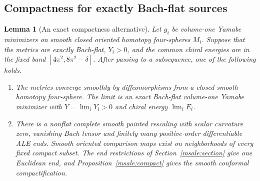 \documentclass[11pt]{article}
\numberwithin{equation}{section}
\newtheorem{lemma}[theorem]{Lemma}
\theoremstyle{definition}
\theoremstyle{remark}
\begin{document}
\subsection{Compactness for exactly Bach-flat sources}

\begin{lemma}[An exact compactness alternative]\label{msgap:compactness}
Let \(g_i\) be volume-one Yamabe minimizers on smooth closed oriented
homotopy four-spheres \(M_i\). Suppose that the metrics are exactly
Bach-flat, \(Y_i>0\), and the common chiral energies are in the
fixed band \([4\pi^2,8\pi^2-\delta]\).
After passing to a subsequence, one of the following holds.
\begin{enumerate}[label=\textup{(\roman*)}]
\item The metrics converge smoothly by diffeomorphisms from a
      closed smooth homotopy four-sphere. The limit is an exact
      Bach-flat volume-one Yamabe minimizer with
      \(Y=\lim_iY_i>0\) and chiral energy \(\lim_iE_i\).
\item There is a nonflat complete smooth pointed rescaling with
      scalar curvature zero, vanishing Bach tensor and finitely
      many positive-order differentiable ALE ends. Smooth
      oriented comparison maps exist on neighborhoods of
      every fixed compact subset. The end restrictions of
      Section~\ref{msale:section} give one Euclidean end,
      and Proposition~\ref{msale:compact} gives the smooth
      conformal compactification.
\end{enumerate}
\end{lemma}
\end{document}
